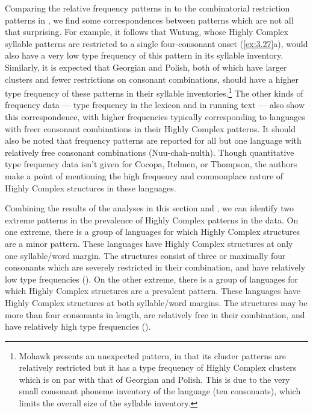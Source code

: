   Comparing the relative frequency patterns in  to the combinatorial restriction patterns in , we find some correspondences between patterns which are not all that surprising. For example, it follows that Wutung, whose Highly Complex syllable patterns are restricted to a single four-consonant onset (\ref{ex:3.27}a), would also have a very low type frequency of this pattern in its syllable inventory. Similarly, it is expected that Georgian and Polish, both of which have larger clusters and fewer restrictions on consonant combinations, should have a higher type frequency of these patterns in their syllable inventories.\footnote{{Mohawk presents an unexpected pattern, in that its cluster patterns are relatively restricted but it has a type frequency of Highly Complex clusters which is on par with that of Georgian and Polish. This is due to the very small consonant phoneme inventory of the language (ten consonants), which limits the overall size of the syllable inventory.}} The other kinds of frequency data — type frequency in the lexicon and in running text — also show this correspondence, with higher frequencies typically corresponding to languages with freer consonant combinations in their Highly Complex patterns. It should also be noted that frequency patterns are reported for all but one language with relatively free consonant combinations (Nuu-chah-nulth). Though quantitative type frequency data isn’t given for Cocopa, Itelmen, or Thompson, the authors make a point of mentioning the high frequency and commonplace nature of Highly Complex structures in these languages. 

  Combining the results of the analyses in this section and , we can identify two extreme patterns in the prevalence of Highly Complex patterns in the data. On one extreme, there is a group of languages for which Highly Complex structures are a minor pattern. These languages have Highly Complex structures at only one syllable/word margin. The structures consist of three or maximally four consonants which are severely restricted in their combination, and have relatively low type frequencies (). On the other extreme, there is a group of languages for which Highly Complex structures are a prevalent pattern. These languages have Highly Complex structures at both syllable/word margins. The structures may be more than four consonants in length, are relatively free in their combination, and have relatively high type frequencies ().

